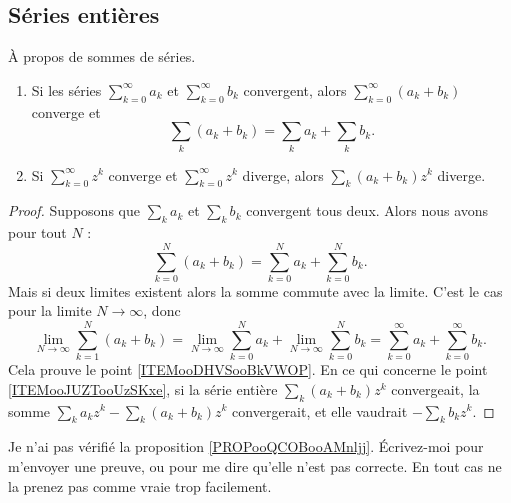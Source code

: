 \subsection{Séries entières}


\begin{proposition}     \label{PROPooUEBWooUQBQvP}
	À propos de sommes de séries.
	\begin{enumerate}
		\item		\label{ITEMooDHVSooBkVWOP}
		      Si les séries \( \sum_{k=0}^{\infty}a_k\) et \( \sum_{k=0}^{\infty}b_k\) convergent, alors \( \sum_{k=0}^{\infty}(a_k+b_k)\) converge et
		      \begin{equation}
			      \sum_k (a_k+b_k) = \sum_k a_k + \sum_k b_k.
		      \end{equation}
		\item	\label{ITEMooJUZTooUzSKxe}
		      Si \( \sum_{k=0}^{\infty}z^k\) converge et \( \sum_{k=0}^{\infty}z^k\) diverge, alors \( \sum_{k}(a_k+b_k)z^k\) diverge.
	\end{enumerate}
\end{proposition}

\begin{proof}
	Supposons que \( \sum_ka_k\) et \( \sum_kb_k\) convergent tous deux. Alors nous avons pour tout \( N\) :
	\begin{equation}
		\sum_{k=0}^N(a_k+b_k)=\sum_{k=0}^Na_k+\sum_{k=0}^Nb_k.
	\end{equation}
	Mais si deux limites existent alors la somme commute avec la limite. C'est le cas pour la limite \( N\to \infty\), donc
	\begin{equation}
		\lim_{N\to \infty} \sum_{k=1}^{N}(a_k+b_k)=\lim_{N\to \infty} \sum_{k=0}^{N}a_k+\lim_{N\to \infty} \sum_{k=0}^{N}b_k=\sum_{k=0}^{\infty}a_k+\sum_{k=0}^{\infty}b_k.
	\end{equation}
	Cela prouve le point \ref{ITEMooDHVSooBkVWOP}. En ce qui concerne le point \ref{ITEMooJUZTooUzSKxe}, si la série entière \( \sum_k(a_k+b_k)z^k\) convergeait, la somme \( \sum_ka_kz^k-\sum_k(a_k+b_k)z^k\) convergerait, et elle vaudrait \( -\sum_kb_kz^k\).
\end{proof}

\begin{probleme}
	Je n'ai pas vérifié la proposition \ref{PROPooQCOBooAMnljj}. Écrivez-moi pour m'envoyer une preuve, ou pour me dire qu'elle n'est pas correcte. En tout cas ne la prenez pas comme vraie trop facilement.
\end{probleme}


